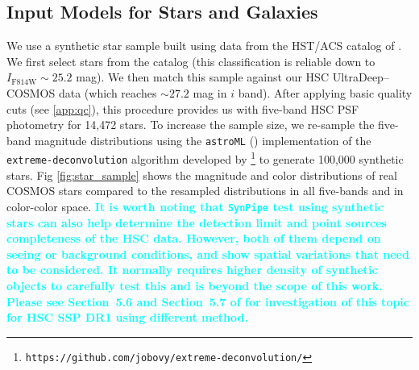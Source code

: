 \documentclass[useamsfonts]{pasj01}
\def\synpipe{\texttt{SynPipe}}
\newcommand{\song}[1]{\textcolor{cyan} {\textbf{#1}}}
\begin{document}
\subsection{Input Models for Stars and Galaxies}
    \label{ssec:inputs}

    We use a synthetic star sample built using data from the HST/ACS catalog of 
    \citet{Leauthaud2007}.  
    We first select stars from the \citet{Leauthaud2007} catalog (this classification 
    is reliable down to $I_{\mathrm{F814W}}{\sim}25.2$ mag). 
    We then match this sample against our HSC UltraDeep--COSMOS data (which reaches 
    ${\sim}27.2$ mag in $i$ band). 
    After applying basic quality cuts (see \ref{app:qc}), this procedure provides us 
    with five-band HSC PSF photometry for 14,472 stars.
    To increase the sample size, we re-sample the five-band magnitude distributions 
    using the \texttt{astroML} (\citealt{astroml}) implementation of the 
    \texttt{extreme-deconvolution} algorithm developed by \citet{Bovy2011}
    \footnote{\texttt{https://github.com/jobovy/extreme-deconvolution/}} to
    generate 100,000 synthetic stars. 
    Fig \ref{fig:star_sample} shows the magnitude and color distributions of real 
    COSMOS stars compared to the resampled distributions in all five-bands and in 
    color-color space.
    \song{
    It is worth noting that \synpipe{} test using synthetic stars can also help 
    determine the detection limit and point sources completeness of the HSC data. 
    However, both of them depend on seeing or background conditions, and show 
    spatial variations that need to be considered.  
    It normally requires higher density of synthetic objects to carefully test this 
    and is beyond the scope of this work.  
    Please see Section~5.6 and Section~5.7 of \citet{HSCDR1} for investigation of 
    this topic for HSC SSP DR1 using different method.
    }
\end{document}
